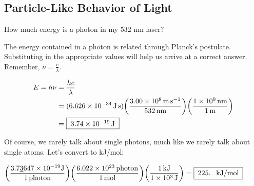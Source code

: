 \documentclass[12pt,letterpaper]{article}
\begin{document}
\subsection*{Particle-Like Behavior of Light}

How much energy is a photon in my 532 nm laser?

{\color{blue}
The energy contained in a photon is related through Planck's postulate.
Substituting in the appropriate values will help us arrive at a correct answer.
Remember, $\nu=\frac{c}{\lambda}$.

\begin{align*}
	E = h\nu &= \dfrac{hc}{\lambda} \\
	&= (\SI{6.626e-34}{\joule\second}) \bigg(
	\dfrac{\SI{3.00e8}{\meter\per\second}}{\SI{532}{\nano\meter}} \bigg)
	\bigg( \dfrac{\SI{1e9}{\nano\meter}}{\SI{1}{\meter}}\bigg) \\
	&= \framebox[1.2\width]{\SI{3.74e-19}{\joule}}
\end{align*}

Of course, we rarely talk about single photons, much like we rarely talk about
single atoms. Let's convert to kJ/mol:

\begin{center}
\begin{math}
	\bigg( \dfrac{3.7\underline{3}647 \times 10^{-19}
	\si{\joule}}{\SI{1}{photon}}\bigg)
	\bigg( \dfrac{\SI{6.022e23}{photon}}{\SI{1}{\mole}} \bigg)
	\bigg( \dfrac{\SI{1}{\kilo\joule}}{\SI{1e3}{\joule}} \bigg) 
	= \framebox[1.2\width]{225. \si{\ \kilo\joule\per\mole}}
\end{math}
\end{center}


}
\end{document}
